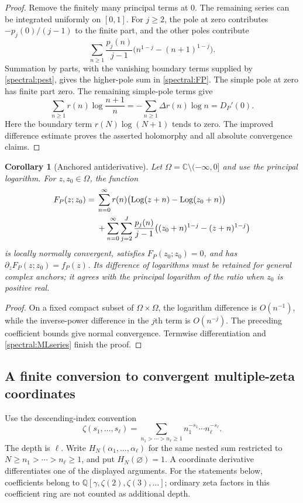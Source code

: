 \documentclass[11pt,a4paper]{article}
\numberwithin{equation}{section}
\newtheorem{corollary}[theorem]{Corollary}
\theoremstyle{definition}
\theoremstyle{remark}
\newcommand{\Q}{\mathbb Q}
\newcommand{\C}{\mathbb C}
\begin{document}
\begin{proof}
Remove the finitely many principal terms at $0$.  The remaining series
can be integrated uniformly on $[0,1]$.  For $j\geq2$, the pole at zero
contributes $-p_j(0)/(j-1)$ to the finite part, and the other poles
contribute
\[
 \sum_{n\geq1}\frac{p_j(n)}{j-1}
                  \bigl(n^{1-j}-(n+1)^{1-j}\bigr).
\]
Summation by parts, with the vanishing boundary terms supplied by
\eqref{spectral:pest}, gives the higher-pole sum in
\eqref{spectral:FP}.  The simple pole at zero has finite part zero.
The remaining simple-pole terms give
\[
 \sum_{n\geq1}r(n)\log\frac{n+1}{n}
     =-\sum_{n\geq1}\Delta r(n)\log n=D_P'(0).
\]
Here the boundary term $r(N)\log(N+1)$ tends to zero.  The improved
difference estimate proves the asserted holomorphy and all absolute
convergence claims.
\end{proof}

\begin{corollary}[Anchored antiderivative]\label{spectral:primitive}
Let $\Omega=\C\setminus(-\infty,0]$ and use the principal logarithm.
For $z,z_0\in\Omega$, the function
\begin{align}\label{spectral:primitiveformula}
 F_P(z;z_0)={}&\sum_{n=0}^{\infty}r(n)
       \bigl(\operatorname{Log}(z+n)-\operatorname{Log}(z_0+n)\bigr)
       \notag\\
 &+\sum_{n=0}^{\infty}\sum_{j=2}^{J}\frac{p_j(n)}{j-1}
       \bigl((z_0+n)^{1-j}-(z+n)^{1-j}\bigr)
\end{align}
is locally normally convergent, satisfies $F_P(z_0;z_0)=0$, and has
$\partial_zF_P(z;z_0)=f_P(z)$.  Its difference of logarithms must be
retained for general complex anchors; it agrees with the principal
logarithm of the ratio when $z_0$ is positive real.
\end{corollary}

\begin{proof}
On a fixed compact subset of $\Omega\times\Omega$, the logarithm
difference is $O(n^{-1})$, while the inverse-power difference in the
$j$th term is $O(n^{-j})$.  The preceding coefficient bounds give normal
convergence.  Termwise differentiation and
\eqref{spectral:MLseries} finish the proof.
\end{proof}

\subsection{A finite conversion to convergent multiple-zeta coordinates}

Use the descending-index convention
\[
 \zeta(s_1,\ldots,s_\ell)
    =\sum_{n_1>\cdots>n_\ell\geq1}
       n_1^{-s_1}\cdots n_\ell^{-s_\ell}.
\]
The depth is $\ell$.  Write $H_N(\alpha_1,\ldots,\alpha_\ell)$ for the
same nested sum restricted to $N\geq n_1>\cdots>n_\ell\geq1$, and put
$H_N(\varnothing)=1$.  A coordinate derivative differentiates one
of the displayed arguments.  For the statements below, coefficients
belong to $\Q[\gamma,\zeta(2),\zeta(3),\ldots]$; ordinary zeta factors
in this coefficient ring are not counted as additional depth.
\end{document}

